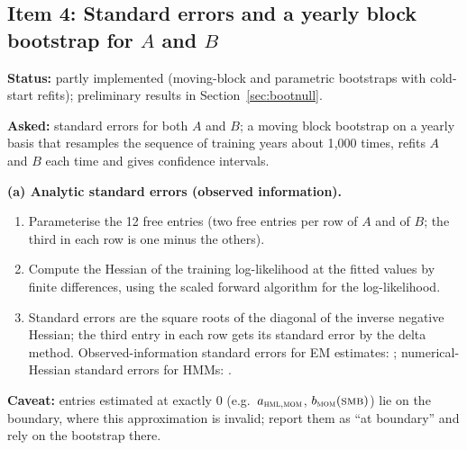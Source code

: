 \documentclass[11pt]{article}
\begin{document}
\subsection{Item 4: Standard errors and a yearly block bootstrap for $A$ and $B$}
\textbf{Status:} partly implemented (moving-block and parametric bootstraps with cold-start refits); preliminary results in Section~\ref{sec:bootnull}.

\textbf{Asked:} standard errors for both $A$ and $B$; a moving block bootstrap on a yearly basis that resamples the sequence of training years about 1{,}000 times, refits $A$ and $B$ each time and gives confidence intervals.

\textbf{(a) Analytic standard errors (observed information).}
\begin{enumerate}
\item Parameterise the 12 free entries (two free entries per row of $A$ and of $B$; the third in each row is one minus the others).
\item Compute the Hessian of the training log-likelihood at the fitted values by finite differences, using the scaled forward algorithm for the log-likelihood.
\item Standard errors are the square roots of the diagonal of the inverse negative Hessian; the third entry in each row gets its standard error by the delta method. Observed-information standard errors for EM estimates: \citet{louis1982}; numerical-Hessian standard errors for HMMs: \citet{zucchini2016}.
\end{enumerate}
\textbf{Caveat:} entries estimated at exactly 0 (e.g.\ $a_{\textsc{hml},\textsc{mom}}$, $b_{\textsc{mom}}(\textsc{smb})$) lie on the boundary, where this approximation is invalid; report them as ``at boundary'' and rely on the bootstrap there.
\end{document}
